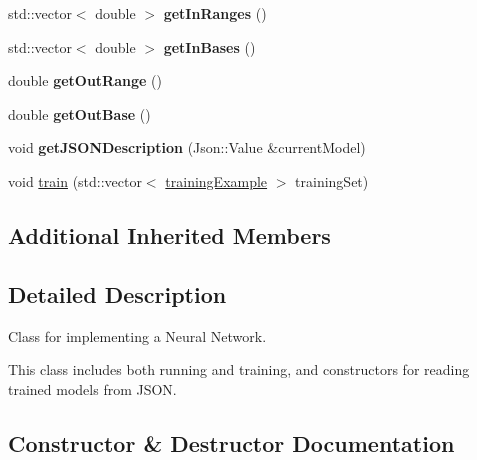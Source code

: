\begin{DoxyCompactItemize}
\item 
\mbox{\label{classneural_network_a876638749a0c7027e82da294947f1840}} 
std\+::vector$<$ double $>$ {\bfseries get\+In\+Ranges} ()
\item 
\mbox{\label{classneural_network_af3fdc1c2bdf4794680ccc4cd845fb47e}} 
std\+::vector$<$ double $>$ {\bfseries get\+In\+Bases} ()
\item 
\mbox{\label{classneural_network_a9890f2967b4442eda4087869c57bccfd}} 
double {\bfseries get\+Out\+Range} ()
\item 
\mbox{\label{classneural_network_a4524958a9de02bd5e48d0c991d634788}} 
double {\bfseries get\+Out\+Base} ()
\item 
\mbox{\label{classneural_network_a83f5c57ed3f555cd534a6f4ea425dfb7}} 
void {\bfseries get\+J\+S\+O\+N\+Description} (Json\+::\+Value \&current\+Model)
\item 
void \hyperlink{classneural_network_aae35def98392b0d0a51f2c82afc48efc}{train} (std\+::vector$<$ \hyperlink{structtraining_example}{training\+Example} $>$ training\+Set)
\end{DoxyCompactItemize}
\subsection*{Additional Inherited Members}


\subsection{Detailed Description}
Class for implementing a Neural Network.

This class includes both running and training, and constructors for reading trained models from J\+S\+ON. 

\subsection{Constructor \& Destructor Documentation}
\mbox{\label{classneural_network_aee6fd482cd0b6b4004759bb57d4b14db}} 
